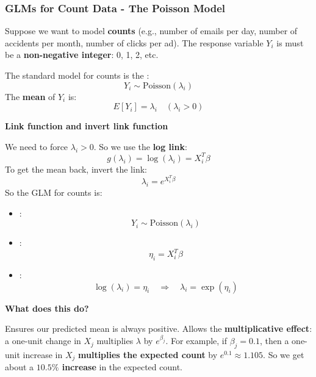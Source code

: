 \subsubsection{GLMs for Count Data - The Poisson Model}

Suppose we want to model \textbf{counts} (e.g., number of emails per day, number of accidents per month, number of clicks per ad). The response variable $Y_i$ is must be a \textbf{non-negative integer}: 0, 1, 2, etc.

\highspace
The standard model for counts is the :
\begin{equation}
    Y_i \sim \text{Poisson}(\lambda_i)
\end{equation}
The \textbf{mean} of $Y_i$ is:
\begin{equation}
    E[Y_i] = \lambda_i \quad (\lambda_i > 0)
\end{equation}

\highspace
\begin{flushleft}
    \textcolor{Green3}{ \textbf{Link function and invert link function}}
\end{flushleft}
We need to force $\lambda_i > 0$. So we use the \textbf{log link}:
\begin{equation}
    g\left(\lambda_i\right) = \log\left(\lambda_i\right) = X_i^T \beta
\end{equation}
To get the mean back, invert the link:
\begin{equation}
    \lambda_i = e^{X_{i}^{T} \beta}
\end{equation}
So the GLM for counts is:
\begin{itemize}
    \item {}:
    \begin{equation*}
        Y_i \sim \text{Poisson}(\lambda_i)
    \end{equation*}
    \item {}:
    \begin{equation*}
        \eta_i = X_i^T \beta
    \end{equation*}
    \item {}:
    \begin{equation*}
        \log(\lambda_i) = \eta_i
        \quad
        \Longrightarrow
        \quad
        \lambda_i = \exp(\eta_i)
    \end{equation*}
\end{itemize}

\highspace
\begin{flushleft}
    \textcolor{Green3}{ \textbf{What does this do?}}
\end{flushleft}
Ensures our predicted mean is always positive. Allows the \textbf{multiplicative effect}: a one-unit change in $X_j$ multiplies $\lambda$ by $e^{\beta_j}$. For example, if $\beta_j = 0.1$, then a one-unit increase in $X_j$ \textbf{multiplies the expected count} by $e^{0.1} \approx 1.105$. So we get about a \textbf{$10.5\%$ increase} in the expected count.